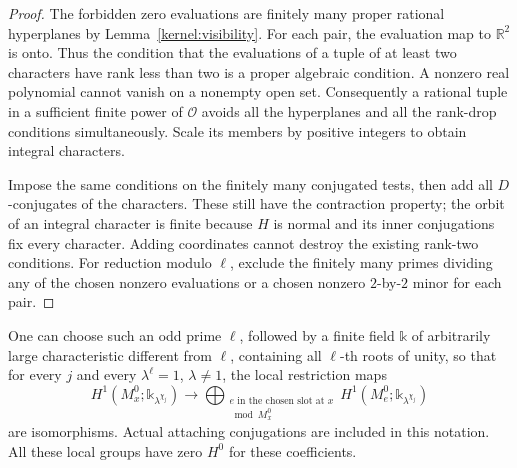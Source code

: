 \begin{proof}
The forbidden zero evaluations are finitely many proper rational
hyperplanes by Lemma~\ref{kernel:visibility}.  For each pair, the
evaluation map to \(\mathbb R^2\) is onto.  Thus the condition that the
evaluations of a tuple of at least two characters have rank less than
two is a proper algebraic condition.  A nonzero real polynomial cannot
vanish on a nonempty open set.  Consequently a rational tuple in a
sufficient finite power of \(\mathcal O\) avoids all the hyperplanes
and all the rank-drop conditions simultaneously.  Scale its members
by positive integers to obtain integral characters.

Impose the same conditions on the finitely many conjugated tests,
then add all \(D\)-conjugates of the characters.  These still have the
contraction property; the orbit of an integral character is finite
because \(H\) is normal and its inner conjugations fix every character.
Adding coordinates cannot destroy the existing rank-two conditions.
For reduction modulo \(\ell\), exclude the finitely many primes
dividing any of the chosen nonzero evaluations or a chosen nonzero
\(2\)-by-\(2\) minor for each pair.
\end{proof}

\begin{lemma}\label{kernel:scalar-specialization}
One can choose such an odd prime \(\ell\), followed by a finite field
\(\mathbb k\) of arbitrarily large characteristic different from
\(\ell\), containing all \(\ell\)-th roots of unity, so that for every
\(j\) and every \(\lambda^\ell=1\), \(\lambda\ne1\), the local
restriction maps
\[
 H^1(M_x^0;\mathbb k_{\lambda^{\chi_j}})
       \longrightarrow
 \bigoplus_{\substack{e\text{ in the chosen slot at }x\\
                         \bmod M_x^0}}
 H^1(M_e^0;\mathbb k_{\lambda^{\chi_j}})
\]
are isomorphisms.  Actual attaching conjugations are included in this
notation.  All these local groups have zero \(H^0\) for these
coefficients.
\end{lemma}

